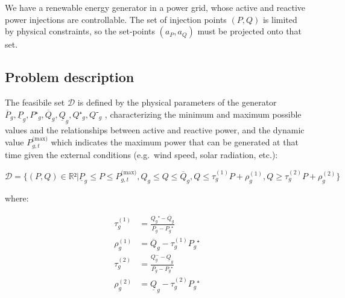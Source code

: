 \documentclass[
]{article}
\begin{document}
We have a renewable energy generator in a power grid, whose active and
reactive power injections are controllable. The set of injection points
\((P,Q)\) is limited by physical constraints, so the set-points
\((a_P, a_Q)\) must be projected onto that set.

\subsection{Problem description}\label{problem-description}

The feasibile set \(\mathcal{D}\) is defined by the physical parameters
of the generator
\(\overline{P}_g, \underline{P}_g, P⁺_g, \overline{Q}_g, \underline{Q}_g, Q⁺_g, Q⁻_g\)
, characterizing the minimum and maximum possible values and the
relationships between active and reactive power, and the dynamic value
\(P^{\textrm{(max)}}_{g,t}\) which indicates the maximum power that can
be generated at that time given the external conditions (e.g.~wind
speed, solar radiation, etc.):

\begin{equation}
\mathcal{D} = \{(P, Q) \in \mathbb{R}² | \underline{P}_g \leq P \leq P^{\textrm{(max)}}_{g,t}, Q_g \leq Q \leq \overline{Q}_g, Q \leq \tau^{(1)}_g P + \rho_g^{(1)}, Q \geq \tau^{(2)}_g P + \rho_g^{(2)}\}
\end{equation}

where:

\begin{align}
    \tau^{(1)}_g &= \frac{Q_g⁺ - \overline{Q}_g}{\overline{P_g} - P_g⁺}\\
    \rho^{(1)}_g &= \overline{Q}_g - \tau^{(1)}_gP_g⁺\\
    \tau^{(2)}_g &= \frac{Q_g^- - \underline{Q}_g}{\overline{P_g} - P_g⁺}\\
    \rho^{(2)}_g &= \underline{Q}_g - \tau^{(2)}_gP_g⁺  \\
\end{align}
\end{document}
